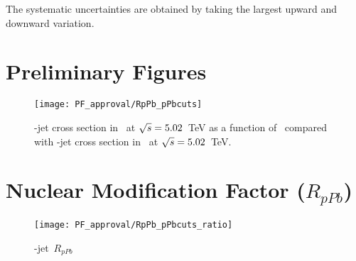 The systematic uncertainties are obtained by taking the largest upward and downward variation.

%
%


\section{Preliminary Figures}


\begin{figure}[bth]
\begin{center}
\texttt{[image: PF\_approval/RpPb\_pPbcuts]}
\caption{\Dzero-jet cross section in \pp\ at $\sqrt{s}=5.02$~TeV as a function of \ptchjet\ compared with \Dzero-jet cross section in \pPb\ at $\sqrt{s}=5.02$~TeV.} 
\label{fig:PromptD0JetPtSpectrum_pp_pPb}
\end{center}
\end{figure}



\section{Nuclear Modification Factor ($R_{pPb}$)}

\begin{figure}[bth]
\centering
\texttt{[image: PF\_approval/RpPb\_pPbcuts\_ratio]}
\caption{\Dzero-jet\ $R_{pPb}$}
\label{fig:SysUnce_Dzero}
\end{figure}


